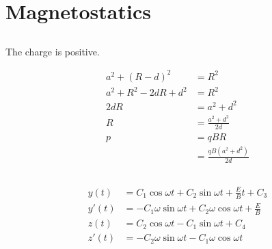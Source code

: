 \documentclass{article}
\begin{document}
\section{Magnetostatics}

\subsection{}

The charge is positive.

\begin{align*}
  a^2 + (R - d)^2         & = R^2                         \\
  a^2 + R^2 - 2 d R + d^2 & = R^2                         \\
  2 d R                   & = a^2 + d^2                   \\
  R                       & = \frac{a^2 + d^2}{2 d}       \\
  p                       & = q B R                       \\
                          & = \frac{q B (a^2 + d^2)}{2 d}
\end{align*}

\subsection{}

\begin{align*}
  y(t)  & = C_1 \cos \omega t + C_2 \sin \omega t + \frac{E}{B} t + C_3        \\
  y'(t) & = -C_1 \omega \sin \omega t + C_2 \omega \cos \omega t + \frac{E}{B} \\
  z(t)  & = C_2 \cos \omega t - C_1 \sin \omega t + C_4                        \\
  z'(t) & = -C_2 \omega \sin \omega t - C_1 \omega \cos \omega t
\end{align*}
\end{document}
